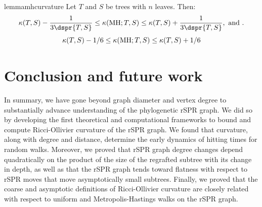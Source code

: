 \documentclass[11pt]{amsart}
\newcommand{\MH}{\operatorname{MH}}
\newcommand{\curvature}[2][]{%
    \ifthenelse{\equal{#1}{}}%
		{\kappa(#2)}%
		{\kappa_{#1}(#2)}%
}
\begin{document}
\begin{restatable}{lemma}{mhcurvature}
	\label{lem:mh_curvature}
	Let $T$ and $S$ be trees with $n$ leaves. Then:
	$$\curvature{T,S} - \frac{1}{3\dspr{T,S}}
	\le \curvature{\MH; T,S}
	\le \curvature{T,S} + \frac{1}{3\dspr{T,S}}, \text{ and }.$$
	$$\curvature{T,S} - 1/6
	\le \curvature{\MH; T,S}
	\le \curvature{T,S} + 1/6$$
\end{restatable}

\section{Conclusion and future work}
In summary, we have gone beyond graph diameter and vertex degree to substantially advance understanding of the phylogenetic rSPR graph.
We did so by developing the first theoretical and computational frameworks to bound and compute Ricci-Ollivier curvature of the rSPR graph.
We found that curvature, along with degree and distance, determine the early dynamics of hitting times for random walks.
Moreover, we proved that rSPR graph degree changes depend quadratically on the product of the size of the regrafted subtree with its change in depth, as well as that the rSPR graph tends toward flatness with respect to rSPR moves that move asymptotically small subtrees.
Finally, we proved that the coarse and asymptotic definitions of Ricci-Ollivier curvature are closely related with respect to uniform and Metropolis-Hastings walks on the rSPR graph.
\end{document}
